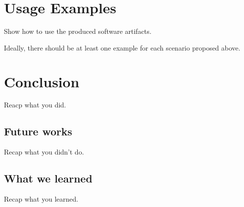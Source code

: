 \documentclass[12pt,a4paper,oneside,article]{article}
\begin{document}
	\section{Usage Examples}
		Show how to use the produced software artifacts.
		
		Ideally, there should be at least one example for each scenario proposed above.
		
	\section{Conclusion}
		Reacp what you did.
		
		\subsection{Future works}
			Recap what you didn't do.
		
		\subsection{What we learned}
			Recap what you learned.
\end{document}
